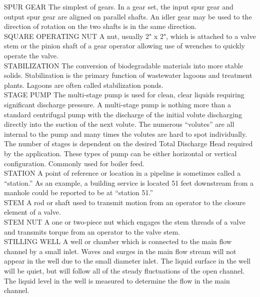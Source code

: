 SPUR GEAR
The simplest of gears. In a gear set, the input spur gear and output spur gear are aligned on parallel shafts. An idler gear may be used to the direction of rotation on the two shafts is in the same direction.
\vspace{0.3cm}\\
SQUARE OPERATING NUT
A nut, usually 2" x 2", which is attached to a valve stem or the pinion shaft of a gear operator allowing use of wrenches to quickly operate the valve.
\vspace{0.3cm}\\
STABILIZATION
The conversion of biodegradable materials into more stable solids. Stabilization is the primary function of wastewater lagoons and treatment plants. Lagoons are often called stabilization ponds.
\vspace{0.3cm}\\
STAGE PUMP
The multi-stage pump is used for clean, clear liquids requiring significant discharge pressure. A multi-stage pump is nothing more than a standard centrifugal pump with the discharge of the initial volute discharging directly into the suction of the next volute. The numerous “volutes” are all internal to the pump and many times the volutes are hard to spot individually. The number of stages is dependent on the desired Total Discharge Head required by the application. These types of pump can be either horizontal or vertical configuration. Commonly used for boiler feed.
\vspace{0.3cm}\\
STATION
A point of reference or location in a pipeline is sometimes called a “station.” As an example, a building service is located 51 feet downstream from a manhole could be reported to be at “station 51.” 
\vspace{0.3cm}\\
STEM
A rod or shaft used to transmit motion from an operator to the closure element of a valve.
\vspace{0.3cm}\\
STEM NUT
A one or two-piece nut which engages the stem threads of a valve and transmits torque from an operator to the valve stem.
\vspace{0.3cm}\\
STILLING WELL
A well or chamber which is connected to the main flow channel by a small inlet. Waves and surges in the main flow stream will not appear in the well due to the small diameter inlet. The liquid surface in the well will be quiet, but will follow all of the steady fluctuations of the open channel. The liquid level in the well is measured to determine the flow in the main channel. 
